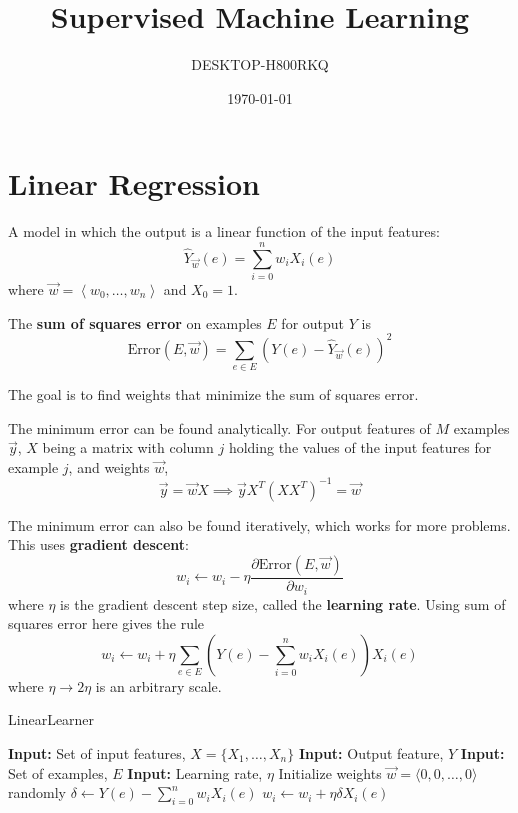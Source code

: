 \documentclass[11pt]{article}
\author{DESKTOP-H800RKQ}
\date{\today}
\title{Supervised Machine Learning}
\begin{document}
\maketitle
\tableofcontents

\section{Linear Regression}
\label{sec:org5b6baf4}
A model in which the output is a linear function of the input features:
$$ \hat{Y}_{\vec{w}}(e) = \sum_{i=0}^{n} w_{i}X_{i}(e) $$
where \(\vec{w} = \left< w_{0}, \dots, w_{n} \right>\) and \(X_{0} = 1\).

The \textbf{sum of squares error} on examples \(E\) for output \(Y\) is
$$ \text{Error}(E, \vec{w}) = \sum_{e \in E} (Y(e) - \hat{Y}_{\vec{w}}(e))^{2} $$

The goal is to find weights that minimize the sum of squares error.

The minimum error can be found analytically.
For output features of \(M\) examples \(\vec{y}\), \(X\) being a matrix with column \(j\)
holding the values of the input features for example \(j\), and weights \(\vec{w}\),
$$ \vec{y} = \vec{w} X \implies \vec{y} X^{T} (XX^{T})^{-1} = \vec{w} $$

The minimum error can also be found iteratively, which works for more problems.
This uses \textbf{gradient descent}:
$$ w_{i} \gets w_{i} - \eta \frac{\partial \text{Error}(E, \vec{w})}{\partial w_{i}} $$
where \(\eta\) is the gradient descent step size, called the \textbf{learning rate}.
Using sum of squares error here gives the rule
$$ w_{i} \gets w_{i} + \eta \sum_{e \in E} \left( Y(e) - \sum_{i=0}^{n} w_{i} X_{i}(e) \right) X_{i}(e) $$
where \(\eta \to 2\eta\) is an arbitrary scale.

\begin{algorithm}
\caption{LinearLearner}
\begin{algorithmic}[1]
\State \textbf{Input:} Set of input features, $X = \{X_1, \dots, X_n\}$
\State \textbf{Input:} Output feature, $Y$
\State \textbf{Input:} Set of examples, $E$
\State \textbf{Input:} Learning rate, $\eta$
\State Initialize weights $\vec{w} = \langle 0, 0, \dots, 0 \rangle$ randomly
\Repeat
        \State $\delta \gets Y(e) - \sum_{i=0}^{n} w_i X_i(e)$
            \State $w_i \gets w_i + \eta \delta X_i(e)$
        \EndFor
    \EndFor
{}
\end{algorithmic}
\end{algorithm}
\end{document}
